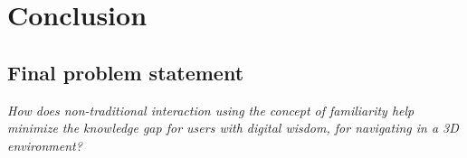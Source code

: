 \section{Conclusion}

\subsection{Final problem statement}
\textit{How does non-traditional interaction using the concept of familiarity help minimize the knowledge gap for users with digital wisdom, for navigating in a 3D environment?}